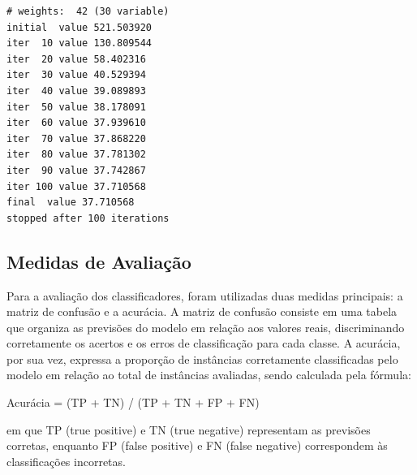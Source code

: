 \documentclass[
  letterpaper,
  DIV=11,
  numbers=noendperiod]{scrartcl}
\newenvironment{Shaded}{\begin{snugshade}}{\end{snugshade}}
\newcommand{\AttributeTok}[1]{\textcolor[rgb]{0.40,0.45,0.13}{#1}}
\newcommand{\CommentTok}[1]{\textcolor[rgb]{0.37,0.37,0.37}{#1}}
\newcommand{\FunctionTok}[1]{\textcolor[rgb]{0.28,0.35,0.67}{#1}}
\newcommand{\NormalTok}[1]{\textcolor[rgb]{0.00,0.23,0.31}{#1}}
\newcommand{\OtherTok}[1]{\textcolor[rgb]{0.00,0.23,0.31}{#1}}
\newcommand{\SpecialCharTok}[1]{\textcolor[rgb]{0.37,0.37,0.37}{#1}}
\begin{document}
\begin{verbatim}
# weights:  42 (30 variable)
initial  value 521.503920 
iter  10 value 130.809544
iter  20 value 58.402316
iter  30 value 40.529394
iter  40 value 39.089893
iter  50 value 38.178091
iter  60 value 37.939610
iter  70 value 37.868220
iter  80 value 37.781302
iter  90 value 37.742867
iter 100 value 37.710568
final  value 37.710568 
stopped after 100 iterations
\end{verbatim}

\begin{Shaded}
\end{Shaded}

\subsection{Medidas de Avaliação}\label{medidas-de-avaliauxe7uxe3o}

Para a avaliação dos classificadores, foram utilizadas duas medidas
principais: a matriz de confusão e a acurácia. A matriz de confusão
consiste em uma tabela que organiza as previsões do modelo em relação
aos valores reais, discriminando corretamente os acertos e os erros de
classificação para cada classe. A acurácia, por sua vez, expressa a
proporção de instâncias corretamente classificadas pelo modelo em
relação ao total de instâncias avaliadas, sendo calculada pela fórmula:

Acurácia = (TP + TN) / (TP + TN + FP + FN)

em que TP (true positive) e TN (true negative) representam as previsões
corretas, enquanto FP (false positive) e FN (false negative)
correspondem às classificações incorretas.
\end{document}
